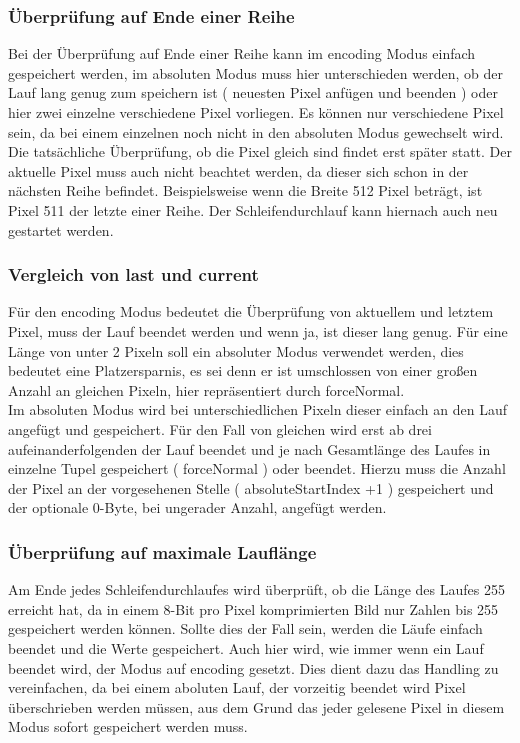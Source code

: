 \documentclass[11pt]{scrartcl}
\begin{document}
\subsubsection{Überprüfung auf Ende einer Reihe}
Bei der Überprüfung auf Ende einer Reihe kann im encoding Modus einfach gespeichert werden, im absoluten Modus muss hier unterschieden werden, ob der Lauf lang genug zum speichern ist ( neuesten Pixel anfügen und beenden ) oder hier zwei einzelne verschiedene Pixel vorliegen. Es können nur verschiedene Pixel sein, da bei einem einzelnen noch nicht in den absoluten Modus gewechselt wird. Die tatsächliche Überprüfung, ob die Pixel gleich sind findet erst später statt. Der aktuelle Pixel muss auch nicht beachtet werden, da dieser sich schon in der nächsten Reihe befindet. Beispielsweise wenn die Breite 512 Pixel beträgt, ist Pixel 511 der letzte einer Reihe. Der Schleifendurchlauf kann hiernach auch neu gestartet werden.
\subsubsection{Vergleich von last und current}
Für den encoding Modus bedeutet die Überprüfung von aktuellem und letztem Pixel, muss der Lauf beendet werden und wenn ja, ist dieser lang genug. Für eine Länge von unter 2 Pixeln soll ein absoluter Modus verwendet werden, dies bedeutet eine Platzersparnis, es sei denn er ist umschlossen von einer großen Anzahl an gleichen Pixeln, hier repräsentiert durch \glqq forceNormal\grqq .\\
Im absoluten Modus wird bei unterschiedlichen Pixeln dieser einfach an den Lauf angefügt und gespeichert. Für den Fall von gleichen wird erst ab drei aufeinanderfolgenden der Lauf beendet und je nach Gesamtlänge des Laufes in einzelne Tupel gespeichert ( forceNormal ) oder beendet. Hierzu muss die Anzahl der Pixel an der vorgesehenen Stelle ( absoluteStartIndex +1 ) gespeichert und der optionale 0-Byte, bei ungerader Anzahl, angefügt werden.
\subsubsection{Überprüfung auf maximale Lauflänge}
Am Ende jedes Schleifendurchlaufes wird überprüft, ob die Länge des Laufes 255 erreicht hat, da in einem 8-Bit pro Pixel komprimierten Bild nur Zahlen bis 255 gespeichert werden können. Sollte dies der Fall sein, werden die Läufe einfach beendet und die Werte gespeichert. Auch hier wird, wie immer wenn ein Lauf beendet wird, der Modus auf encoding gesetzt. Dies dient dazu das Handling zu vereinfachen, da bei einem aboluten Lauf, der vorzeitig beendet wird Pixel überschrieben werden müssen, aus dem Grund das jeder gelesene Pixel in diesem Modus sofort gespeichert werden muss.
\end{document}
